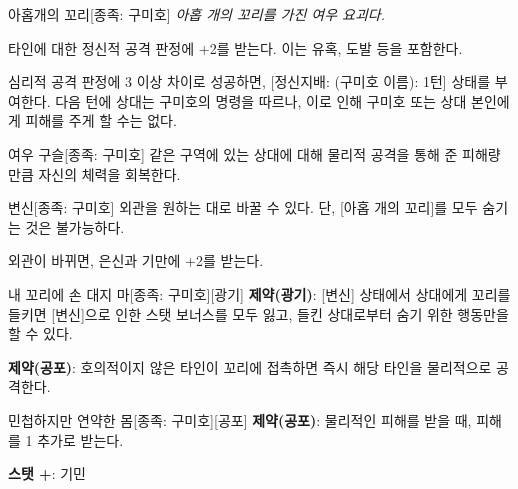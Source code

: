 \documentclass{report}
\begin{document}
	\begin{story}{아홉개의 꼬리}{[종족: 구미호]}
		\textit{아홉 개의 꼬리를 가진 여우 요괴다.}
		
		타인에 대한 정신적 공격 판정에 +2를 받는다. 이는 유혹, 도발 등을 포함한다.
		
		심리적 공격 판정에 3 이상 차이로 성공하면, [정신지배: (구미호 이름): 1턴] 상태를 부여한다. 다음 턴에 상대는 구미호의 명령을 따르나, 이로 인해 구미호 또는 상대 본인에게 피해를 주게 할 수는 없다.
		
	\end{story}

	\begin{story}{여우 구슬}{[종족: 구미호]}
		같은 구역에 있는 상대에 대해 물리적 공격을 통해 준 피해량만큼 자신의 체력을 회복한다.
		
	\end{story}
	
	\begin{story}{변신}{[종족: 구미호]}
		외관을 원하는 대로 바꿀 수 있다. 단, [아홉 개의 꼬리]를 모두 숨기는 것은 불가능하다.
		
		외관이 바뀌면, 은신과 기만에 +2를 받는다.
		
	\end{story}
	
	\begin{story}{내 꼬리에 손 대지 마}{[종족: 구미호][광기]}
		\textbf{제약(광기)}: [변신] 상태에서 상대에게 꼬리를 들키면 [변신]으로 인한 스탯 보너스를 모두 잃고, 들킨 상대로부터 숨기 위한 행동만을 할 수 있다.
		
		\smallskip
		
		\textbf{제약(공포)}: 호의적이지 않은 타인이 꼬리에 접촉하면 즉시 해당 타인을 물리적으로 공격한다.
		
	\end{story}
	
	\begin{story}{민첩하지만 연약한 몸}{[종족: 구미호][공포]}
		\textbf{제약(공포)}: 물리적인 피해를 받을 때, 피해를 1 추가로 받는다.
		
		\smallskip
		
		\textbf{스탯 +}: 기민
		
		\smallskip
		
	\end{story}
	
\end{document}
